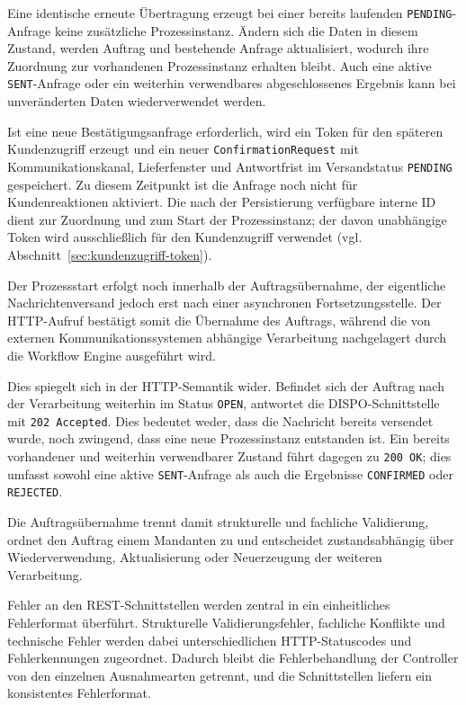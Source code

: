 \documentclass[
  12pt,
  a4paper,
  oneside
]{article}
\begin{document}
Eine identische erneute Übertragung erzeugt bei einer bereits laufenden
\texttt{PENDING}-Anfrage keine zusätzliche Prozessinstanz. Ändern sich die
Daten in diesem Zustand, werden Auftrag und bestehende Anfrage aktualisiert,
wodurch ihre Zuordnung zur vorhandenen Prozessinstanz erhalten bleibt. Auch
eine aktive \texttt{SENT}-Anfrage oder ein weiterhin verwendbares
abgeschlossenes Ergebnis kann bei unveränderten Daten wiederverwendet werden.

Ist eine neue Bestätigungsanfrage erforderlich, wird ein Token für den
späteren Kundenzugriff erzeugt und ein neuer \texttt{ConfirmationRequest} mit
Kommunikationskanal, Lieferfenster und Antwortfrist im Versandstatus
\texttt{PENDING} gespeichert. Zu diesem Zeitpunkt ist die Anfrage noch nicht
für Kundenreaktionen aktiviert. Die nach der Persistierung verfügbare interne
ID dient zur Zuordnung und zum Start der Prozessinstanz; der davon unabhängige
Token wird ausschließlich für den Kundenzugriff verwendet
(vgl. Abschnitt~\ref{sec:kundenzugriff-token}).

Der Prozessstart erfolgt noch innerhalb der Auftragsübernahme, der eigentliche
Nachrichtenversand jedoch erst nach einer asynchronen Fortsetzungsstelle. Der
HTTP-Aufruf bestätigt somit die Übernahme des Auftrags, während die von
externen Kommunikationssystemen abhängige Verarbeitung nachgelagert durch die
Workflow Engine ausgeführt wird.

Dies spiegelt sich in der HTTP-Semantik wider. Befindet sich der Auftrag nach
der Verarbeitung weiterhin im Status \texttt{OPEN}, antwortet die
DISPO-Schnittstelle mit \texttt{202 Accepted}. Dies bedeutet weder, dass die
Nachricht bereits versendet wurde, noch zwingend, dass eine neue
Prozessinstanz entstanden ist. Ein bereits vorhandener und weiterhin
verwendbarer Zustand führt dagegen zu \texttt{200 OK}; dies umfasst sowohl
eine aktive \texttt{SENT}-Anfrage als auch die Ergebnisse
\texttt{CONFIRMED} oder \texttt{REJECTED}.

Die Auftragsübernahme trennt damit strukturelle und fachliche Validierung,
ordnet den Auftrag einem Mandanten zu und entscheidet zustandsabhängig über
Wiederverwendung, Aktualisierung oder Neuerzeugung der weiteren Verarbeitung.

Fehler an den REST-Schnittstellen werden zentral in ein einheitliches
Fehlerformat überführt. Strukturelle Validierungsfehler, fachliche Konflikte und
technische Fehler werden dabei unterschiedlichen HTTP-Statuscodes und
Fehlerkennungen zugeordnet. Dadurch bleibt die Fehlerbehandlung der Controller
von den einzelnen Ausnahmearten getrennt, und die Schnittstellen liefern ein
konsistentes Fehlerformat.
\end{document}
